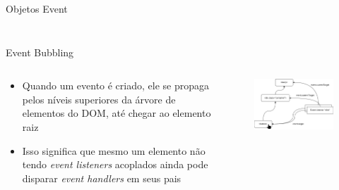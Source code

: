 \begin{frame}{Objetos Event}
  \begin{columns}
    \begin{column}{0.6\textwidth}
      \begin{figure}
        \centering
      \end{figure}
    \end{column}
    \begin{column}{0.3\textwidth}
      \centering
    \end{column}
  \end{columns}
\end{frame}

\begin{frame}{Event Bubbling}
  \begin{columns}
    \begin{column}{0.4\textwidth}
      \begin{itemize}
        \item Quando um evento é criado, ele se propaga pelos níveis superiores da
              árvore de elementos do DOM, até chegar ao elemento raiz
        \item Isso significa que mesmo um elemento não tendo \textit{event listeners}
              acoplados ainda pode disparar \textit{event handlers} em seus pais
      \end{itemize}
    \end{column}
    \begin{column}{0.6\textwidth}
      \begin{figure}
        \centering
        \includegraphics[width=\textwidth]{images/event_bubbling.png}
      \end{figure}
    \end{column}
  \end{columns}
\end{frame}

